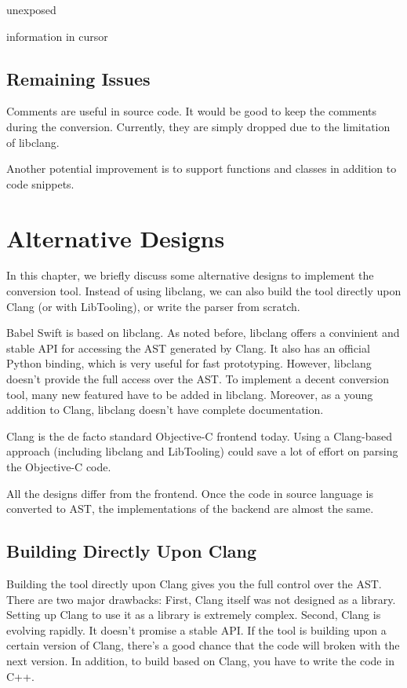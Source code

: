 \documentclass{sfuthesis}
\begin{document}
unexposed

information in cursor


\section{Remaining Issues}

Comments are useful in source code. It would be good to keep the comments during the conversion. Currently, they are simply dropped due to the limitation of libclang. 

Another potential improvement is to support functions and classes in addition to code snippets.

\chapter{Alternative Designs}

In this chapter, we briefly discuss some alternative designs to implement the conversion tool. Instead of using libclang, we can also build the tool directly upon Clang (or with LibTooling), or write the parser from scratch.

Babel Swift is based on libclang. As noted before, libclang offers a convinient and stable API for accessing the AST generated by Clang. It also has an official Python binding, which is very useful for fast prototyping. However, libclang doesn't provide the full access over the AST. To implement a decent conversion tool, many new featured have to be added in libclang. Moreover, as a young addition to Clang, libclang doesn't have complete documentation.

Clang is the de facto standard Objective-C frontend today. Using a Clang-based approach (including libclang and LibTooling) could save a lot of effort on parsing the Objective-C code.

All the designs differ from the frontend. Once the code in source language is converted to AST, the implementations of the backend are almost the same.

\section{Building Directly Upon Clang}

Building the tool directly upon Clang gives you the full control over the AST. There are two major drawbacks: First, Clang itself was not designed as a library. Setting up Clang to use it as a library is extremely complex. Second, Clang is evolving rapidly. It doesn't promise a stable API. If the tool is building upon a certain version of Clang, there's a good chance that the code will broken with the next version. In addition, to build based on Clang, you have to write the code in C++.
\end{document}
